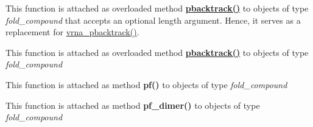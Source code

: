 \begin{DoxyRefList}
\item[\label{wrappers__wrappers000087}%
\Hypertarget{wrappers__wrappers000087}%
Global \hyperlink{group__subopt__stochbt_ga901fe42a33b07be083421741bf7dc610}{vrna\+\_\+pbacktrack} (vrna\+\_\+fold\+\_\+compound\+\_\+t $\ast$vc)]This function is attached as overloaded method {\bfseries \hyperlink{group__subopt__stochbt_gac03ca6db186bb3bf0a2a326d7fb3ba03}{pbacktrack()}} to objects of type {\itshape fold\+\_\+compound} that accepts an optional {\ttfamily length} argument. Hence, it serves as a replacement for \hyperlink{group__subopt__stochbt_ga901fe42a33b07be083421741bf7dc610}{vrna\+\_\+pbacktrack()}.  
\item[\label{wrappers__wrappers000086}%
\Hypertarget{wrappers__wrappers000086}%
Global \hyperlink{group__subopt__stochbt_ga347375a4da8bdff74639529847f97d4f}{vrna\+\_\+pbacktrack5} (vrna\+\_\+fold\+\_\+compound\+\_\+t $\ast$vc, int length)]This function is attached as overloaded method {\bfseries \hyperlink{group__subopt__stochbt_gac03ca6db186bb3bf0a2a326d7fb3ba03}{pbacktrack()}} to objects of type {\itshape fold\+\_\+compound}  
\item[\label{wrappers__wrappers000083}%
\Hypertarget{wrappers__wrappers000083}%
Global \hyperlink{group__pf__fold_ga29e256d688ad221b78d37f427e0e99bc}{vrna\+\_\+pf} (vrna\+\_\+fold\+\_\+compound\+\_\+t $\ast$vc, char $\ast$structure)]This function is attached as method {\bfseries pf()} to objects of type {\itshape fold\+\_\+compound}  
\item[\label{wrappers__wrappers000084}%
\Hypertarget{wrappers__wrappers000084}%
Global \hyperlink{group__pf__cofold_ga4e5c7d06c302a7c59fc0d64dc142ca63}{vrna\+\_\+pf\+\_\+dimer} (vrna\+\_\+fold\+\_\+compound\+\_\+t $\ast$vc, char $\ast$structure)]This function is attached as method {\bfseries pf\+\_\+dimer()} to objects of type {\itshape fold\+\_\+compound}  
\item[\label{wrappers__wrappers000018}%
\Hypertarget{wrappers__wrappers000018}%
Global \hyperlink{group__soft__constraints_gaf162aedac7422f2eb16ea030f47d2f4b}{vrna\+\_\+sc\+\_\+add\+\_\+bp} (vrna\+\_\+fold\+\_\+compound\+\_\+t $\ast$vc, int i, int j, F\+L\+T\+\_\+\+O\+R\+\_\+\+D\+BL energy, unsigned int options)]


\end{DoxyRefList}
